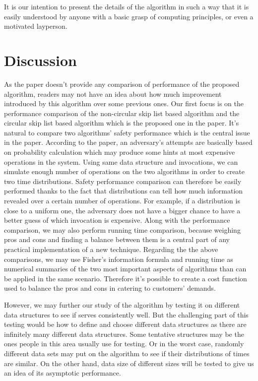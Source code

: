 \documentclass[11pt,twocolumn]{article}
\begin{document}
It is our intention to present the details of the algorithm in such a way that
it is easily understood by anyone with a basic grasp of computing principles,
or even a motivated layperson.


\section{Discussion}

As the paper doesn't provide any comparison of performance of the proposed algorithm, readers may not have an idea about how much improvement introduced by this algorithm over some previous ones. Our first focus is on the performance comparison of the non-circular skip list based algorithm and the circular skip list based algorithm which is the proposed one in the paper. It's natural to compare two algorithms' safety performance which is the central issue in the paper. According to the paper, an adversary's attempts are basically based on probability calculation which may produce some hints at most expensive operations in the system. Using same data structure and invocations, we can simulate enough number of operations on the two algorithms in order to create two time distributions. Safety performance comparison can therefore be easily performed thanks to the fact that distributions can tell how much information revealed over a certain number of operations. For example, if a distribution is close to a uniform one, the adversary does not have a bigger chance to have a  better guess of which invocation is expensive. Along with the performance comparison, we may also perform running time comparison, because weighing pros and cons and finding a balance between them is a central part of any practical implementation of a new technique. Regarding the the above comparisons, we may use Fisher's information formula and running time as numerical summaries of the two most important aspects of algorithms than can be applied in the same scenario. Therefore it's possible to create  a cost function used to balance the pros and cons in catering to customers' demands. 

However, we may further our study of the algorithm by testing it on different data structures to see if serves  consistently well. But the challenging part of this testing would be how to define and choose different data structures as there are infinitely many different data structures. Some tentative structures may be the ones people in this area usually use for testing. Or in the worst case, randomly different data sets  may put on the algorithm to see if their distributions of times are similar. On the other hand, data size of different sizes will be tested to give us an idea of its asymptotic performance. 
\end{document}
